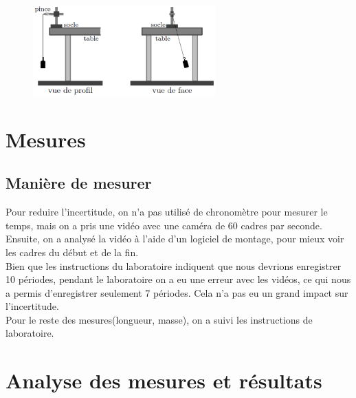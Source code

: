 \documentclass[12pt,a4paper]{article}
\begin{document}
    \begin{figure}[h]
        \centering
        \includegraphics[width=7cm]{laboPhysiqueBPendule.png}
    \end{figure}

    \section{Mesures}
    \subsection{Manière de mesurer}
    Pour reduire l'incertitude, on n'a pas utilisé de chronomètre pour mesurer le temps, mais on a pris une vidéo avec une caméra de 60 cadres par seconde. Ensuite, on a analysé la vidéo à l'aide d'un logiciel de montage, pour mieux voir les cadres du début et de la fin. \\
    Bien que les instructions du laboratoire indiquent que nous devrions enregistrer 10 périodes, pendant le laboratoire on a eu une erreur avec les vidéos, ce qui nous a permis d'enregistrer seulement 7 périodes. Cela n'a pas eu un grand impact sur l'incertitude. \\
    Pour le reste des mesures(longueur, masse), on a suivi les instructions de laboratoire.
    \section{Analyse des mesures et résultats}
\end{document}
